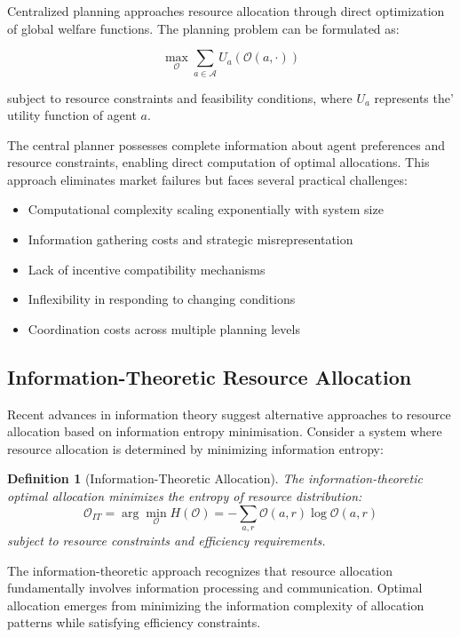 \documentclass[12pt,a4paper]{article}
\newtheorem{definition}[theorem]{Definition}
\begin{document}
Centralized planning approaches resource allocation through direct optimization of global welfare functions. The planning problem can be formulated as:

\begin{equation}
\max_{\mathcal{O}} \sum_{a \in \mathcal{A}} U_a(\mathcal{O}(a,\cdot))
\end{equation}

subject to resource constraints and feasibility conditions, where $U_a$ represents the' utility function of agent $a$.

The central planner possesses complete information about agent preferences and resource constraints, enabling direct computation of optimal allocations. This approach eliminates market failures but faces several practical challenges:
\begin{itemize}
\item Computational complexity scaling exponentially with system size
\item Information gathering costs and strategic misrepresentation
\item Lack of incentive compatibility mechanisms
\item Inflexibility in responding to changing conditions
\item Coordination costs across multiple planning levels
\end{itemize}

\subsection{Information-Theoretic Resource Allocation}

Recent advances in information theory suggest alternative approaches to resource allocation based on information entropy minimisation. Consider a system where resource allocation is determined by minimizing information entropy:

\begin{definition}[Information-Theoretic Allocation]
The information-theoretic optimal allocation minimizes the entropy of resource distribution:
\begin{equation}
\mathcal{O}_{IT} = \arg\min_{\mathcal{O}} H(\mathcal{O}) = -\sum_{a,r} \mathcal{O}(a,r) \log \mathcal{O}(a,r)
\end{equation}
subject to resource constraints and efficiency requirements.
\end{definition}

The information-theoretic approach recognizes that resource allocation fundamentally involves information processing and communication. Optimal allocation emerges from minimizing the information complexity of allocation patterns while satisfying efficiency constraints.
\end{document}
